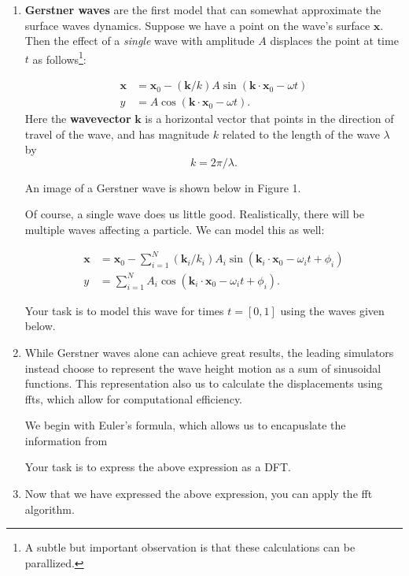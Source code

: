 \documentclass{article}
\begin{document}
    \begin{enumerate}
        \item \textbf{Gerstner waves} are the first model that can somewhat approximate the surface waves dynamics. Suppose we have a point on the wave's surface $\bm{x}$. Then the effect of a \textit{single} wave with amplitude $A$ displaces the point at time $t$ as follows\footnote{A subtle but important observation is that these calculations can be parallized.}:

        \begin{align*}
            \bm{x} &= \bm{x}_{0} - (\bm{k} / k)A\sin(\bm{k} \cdot \bm{x}_{0} - \omega t) \\
            y &= A\cos(\bm{k} \cdot \bm{x}_{0} - \omega t).
        \end{align*}
        Here the \textbf{wavevector} $\bm{k}$ is a horizontal vector that points in the direction of travel of the wave, and has magnitude $k$ related to the length of the wave $\lambda$ by $$k = 2\pi / \lambda.$$

        An image of a Gerstner wave is shown below in Figure 1.

        Of course, a single wave does us little good. Realistically, there will be multiple waves affecting a particle. We can model this as well: 

        \begin{align*}
            \bm{x} &= \bm{x}_{0} - \sum_{i = 1}^{N} (\bm{k}_{i} / k_{i})A_{i}\sin(\bm{k}_{i} \cdot \bm{x}_{0} - \omega_{i} t + \phi_{i}) \\
            y &= \sum_{i = 1}^{N} A_{i}\cos(\bm{k}_{i} \cdot \bm{x}_{0} - \omega_{i} t + \phi_{i}).
        \end{align*}

        Your task is to model this wave for times $t = [0, 1]$ using the waves given below. 
        \item While Gerstner waves alone can achieve great results, the leading simulators instead choose to represent the wave height motion as a sum of sinusoidal functions. This representation also us to calculate the displacements using ffts, which allow for computational efficiency.

        We begin with Euler's formula, which allows us to encapuslate the information from 

        Your task is to express the above expression as a DFT.

        \item Now that we have expressed the above expression, you can apply the fft algorithm.


\end{enumerate}
\end{document}
